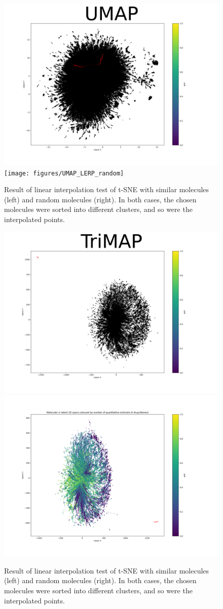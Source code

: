 \begin{figure}[h]
	\centering
	\includegraphics[width=0.5\columnwidth]{figures/UMAP_LERP_coxib}
	\texttt{[image: figures/UMAP\_LERP\_random]}
	\caption{Result of linear interpolation test of t-SNE with similar molecules (left) and random molecules (right). In both cases, the chosen molecules were sorted into different clusters, and so were the interpolated points.}
	\label{fig:umap:lerp}
\end{figure}

\begin{figure}[h]
	\centering
	\includegraphics[width=0.5\columnwidth]{figures/TriMAP_LERP_coxib}
	\includegraphics[width=0.5\columnwidth]{figures/TriMAP_LERP_random}
	\caption{Result of linear interpolation test of t-SNE with similar molecules (left) and random molecules (right). In both cases, the chosen molecules were sorted into different clusters, and so were the interpolated points.}
	\label{fig:trimap:lerp}
\end{figure}

